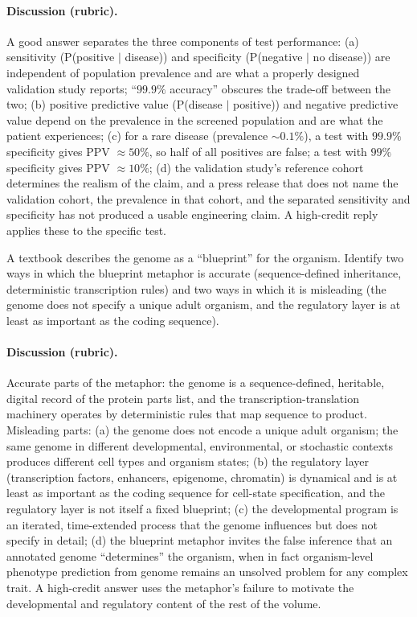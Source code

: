 \paragraph{Discussion (rubric).} A good answer separates the three
components of test performance: (a) sensitivity (P(positive $\mid$
disease)) and specificity (P(negative $\mid$ no disease)) are
independent of population prevalence and are what a properly designed
validation study reports; ``$99.9\%$ accuracy'' obscures the trade-off
between the two; (b) positive predictive value (P(disease $\mid$
positive)) and negative predictive value depend on the prevalence in
the screened population and are what the patient experiences; (c)
for a rare disease (prevalence $\sim 0.1\%$), a test with $99.9\%$
specificity gives PPV $\approx 50\%$, so half of all positives are
false; a test with $99\%$ specificity gives PPV $\approx 10\%$; (d)
the validation study's reference cohort determines the realism of
the claim, and a press release that does not name the validation
cohort, the prevalence in that cohort, and the separated sensitivity
and specificity has not produced a usable engineering claim. A
high-credit reply applies these to the specific test.

\begin{exercise}
A textbook describes the genome as a ``blueprint'' for the organism.
Identify two ways in which the blueprint metaphor is accurate
(sequence-defined inheritance, deterministic transcription rules) and
two ways in which it is misleading (the genome does not specify a
unique adult organism, and the regulatory layer is at least as
important as the coding sequence).
\end{exercise}

\paragraph{Discussion (rubric).} Accurate parts of the metaphor: the
genome is a sequence-defined, heritable, digital record of the protein
parts list, and the transcription-translation machinery operates by
deterministic rules that map sequence to product. Misleading parts:
(a) the genome does not encode a unique adult organism; the same
genome in different developmental, environmental, or stochastic
contexts produces different cell types and organism states; (b) the
regulatory layer (transcription factors, enhancers, epigenome,
chromatin) is dynamical and is at least as important as the coding
sequence for cell-state specification, and the regulatory layer is
not itself a fixed blueprint; (c) the developmental program is an
iterated, time-extended process that the genome influences but does
not specify in detail; (d) the blueprint metaphor invites the false
inference that an annotated genome ``determines'' the organism, when
in fact organism-level phenotype prediction from genome remains an
unsolved problem for any complex trait. A high-credit answer uses
the metaphor's failure to motivate the developmental and regulatory
content of the rest of the volume.

